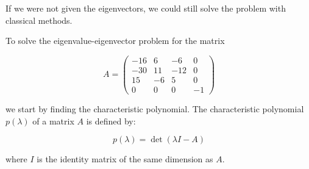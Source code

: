 \documentclass{article}
\begin{document}
If we were not given the eigenvectors, we could still solve the problem with classical methods.

To solve the eigenvalue-eigenvector problem for the matrix

\[
    A = \begin{pmatrix} -16 & 6 & -6 & 0 \\ -30 & 11 & -12 & 0 \\ 15 & -6 & 5 & 0 \\ 0 & 0 & 0 & -1 \end{pmatrix}
\]

we start by finding the characteristic polynomial. The characteristic polynomial \( p(\lambda) \) of a matrix \( A \) is defined by:

\[
    p(\lambda) = \det(\lambda I - A)
\]

where \( I \) is the identity matrix of the same dimension as \( A \).
\end{document}
